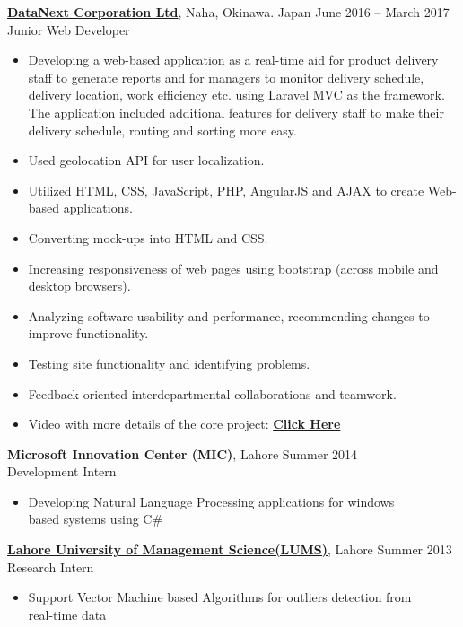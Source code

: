\documentclass[margin,line]{res}
\begin{document}
\begin{resume}
\href{http://www.datanext.co.jp/en/}{\noindent\bf DataNext Corporation Ltd}, Naha, Okinawa. Japan \hfill{June 2016 -- March 2017}\\
Junior Web Developer
\begin{itemize} \itemsep -2pt  %
 \item Developing a web-based application as a real-time aid for product delivery staff to generate reports and for managers to monitor delivery schedule, delivery location, work efficiency etc. using Laravel MVC as the framework.
 The application included additional features for delivery staff to make their delivery schedule, routing and sorting more easy.
 \item Used geolocation API for user localization.
 \item Utilized HTML, CSS, JavaScript, PHP, AngularJS and AJAX to create Web-based applications. 
 \item Converting mock-ups into HTML and CSS.
 \item Increasing responsiveness of web pages using bootstrap (across mobile and desktop browsers).
 \item Analyzing software usability and performance, recommending changes to improve functionality.
 \item Testing site functionality and identifying problems.
 \item Feedback oriented interdepartmental collaborations and teamwork.
 \item Video with more details of the core project: \href{http://bit.ly/2sYT9OH}{\bf Click Here}  

 \end{itemize}

{\noindent\bf Microsoft Innovation Center (MIC)}, Lahore \hfill 
Summer 2014\\
 Development Intern
\begin{itemize} \itemsep -2pt  %
 \item Developing Natural Language Processing applications for windows\\based systems using C\# 
 \end{itemize}
  \href{https://lums.edu.pk/}{\bf Lahore University of Management Science(LUMS)}, Lahore \hfill Summer 2013
\\Research Intern
\begin{itemize} \itemsep -2pt  %
 \item Support Vector Machine based Algorithms for outliers detection from\\real-time data 
 \end{itemize}



\end{resume}
\end{document}
